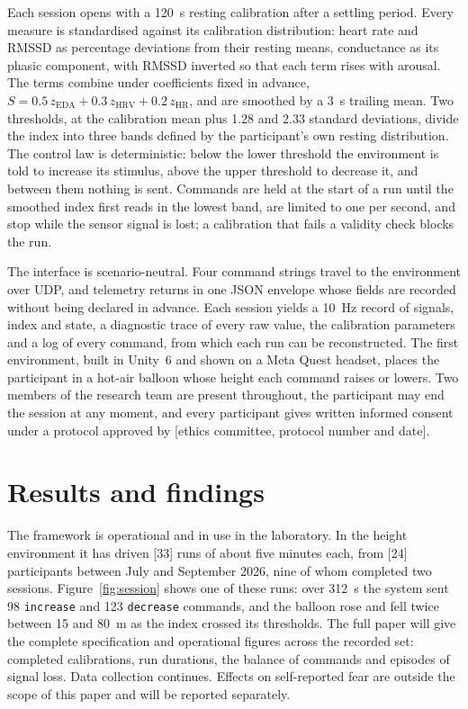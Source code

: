 \documentclass[11pt,a4paper]{article}
\newcommand{\ph}[1]{\textcolor{red!65!black}{[#1]}}
\begin{document}
Each session opens with a 120~s resting calibration after a settling
period. Every measure is standardised against its calibration
distribution: heart rate and RMSSD as percentage deviations from their
resting means, conductance as its phasic component, with RMSSD inverted
so that each term rises with arousal. The terms combine under
coefficients fixed in advance,
$S = 0.5\,z_{\mathrm{EDA}} + 0.3\,z_{\mathrm{HRV}} + 0.2\,z_{\mathrm{HR}}$,
and are smoothed by a 3~s trailing mean. Two thresholds, at the
calibration mean plus 1.28 and 2.33 standard deviations, divide the index
into three bands defined by the participant's own resting distribution.
The control law is deterministic: below the lower threshold the
environment is told to increase its stimulus, above the upper threshold
to decrease it, and between them nothing is sent. Commands are held at
the start of a run until the smoothed index first reads in the lowest
band, are limited to one per second, and stop while the sensor signal is
lost; a calibration that fails a validity check blocks the run.

The interface is scenario-neutral. Four command strings travel to the
environment over UDP, and telemetry returns in one JSON envelope whose
fields are recorded without being declared in advance. Each session
yields a 10~Hz record of signals, index and state, a diagnostic trace of
every raw value, the calibration parameters and a log of every command,
from which each run can be reconstructed. The first environment, built
in Unity~6 and shown on a Meta Quest headset, places the participant in a
hot-air balloon whose height each command raises or lowers. Two members
of the research team are present throughout, the participant may end the
session at any moment, and every participant gives written informed
consent under a protocol approved by \ph{ethics committee, protocol
number and date}.

\section*{Results and findings}

The framework is operational and in use in the laboratory. In the height
environment it has driven \ph{33} runs of about five minutes each, from
\ph{24} participants between July and September 2026, nine of whom
completed two sessions. Figure~\ref{fig:session} shows one of these runs:
over 312~s the system sent 98 \texttt{increase} and 123
\texttt{decrease} commands, and the balloon rose and fell twice between
15 and 80~m as the index crossed its thresholds. The full paper will give
the complete specification and operational figures across the recorded
set: completed calibrations, run durations, the balance of commands and
episodes of signal loss. Data collection continues. Effects on
self-reported fear are outside the scope of this paper and will be
reported separately.
\end{document}
